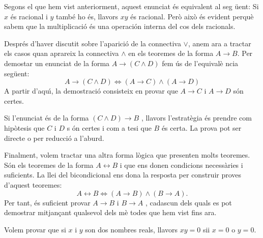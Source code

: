 \begin{solucio}
Segons el que hem vist anteriorment, aquest enunciat \'{e}s equivalent al seg%
\"{u}ent: Si $x$ \'{e}s racional i $y$ tamb\'{e} ho \'{e}s, llavors $xy$
\'{e}s racional. Per\`{o} aix\`{o} \'{e}s evident perqu\`{e} sabem que la
multiplicaci\'{o} \'{e}s una operaci\'{o}n interna del cos dels racionals.
\end{solucio}

\bigskip

Despr\'{e}s d'haver discutit sobre l'aparici\'{o} de la connectiva $\vee$,
anem ara a tractar els casos quan aprareix la connectiva $\wedge$ en els
teoremes de la forma $A\longrightarrow B$. Per demostar un enunciat de la
forma $A\longrightarrow\left( C\wedge D\right) $ fem \'{u}s de l'equival\`{e}%
ncia seg\"{u}ent:%
\begin{equation*}
A\longrightarrow\left( C\wedge D\right) \Longleftrightarrow\left(
A\longrightarrow C\right) \wedge\left( A\longrightarrow D\right)
\end{equation*}
A partir d'aqu\'{\i}, la demostraci\'{o} consisteix en provar que \thinspace$%
A\longrightarrow C$ i $A\longrightarrow D$ s\'{o}n certes.

Si l'enunciat \'{e}s de la forma $\left( C\wedge D\right) \longrightarrow B$%
, llavors l'estrat\`{e}gia \'{e}s prendre com hip\`{o}tesis que $C$ i $D$ s%
\'{o}n certes i com a tesi que $B$ \'{e}s certa. La prova pot ser directe o
per reducci\'{o} a l'aburd.

Finalment, volem tractar una altra forma l\`{o}gica que presenten molts
teoremes. S\'{o}n els teoremes de la forma $A\longleftrightarrow B$ i que
ens donen condicions necess\`{a}ries i suficients. La llei del bicondicional
ens dona la resposta per construir proves d'aquest teoremes:%
\begin{equation*}
A\longleftrightarrow B\Longleftrightarrow\left( A\longrightarrow B\right)
\wedge\left( B\longrightarrow A\right) \text{.}
\end{equation*}
Per tant, \'{e}s suficient provar $A\longrightarrow B$ i $B\longrightarrow A$%
, cadascun dels quals es pot demostrar mitjan\c{c}ant qualsevol dels m\`{e}%
todes que hem vist fins ara.

\begin{exem}
Volem provar que si $x$ i $y$ son dos nombres reals, llavors $xy=0$ sii $x=0$
o $y=0$.
\end{exem}

